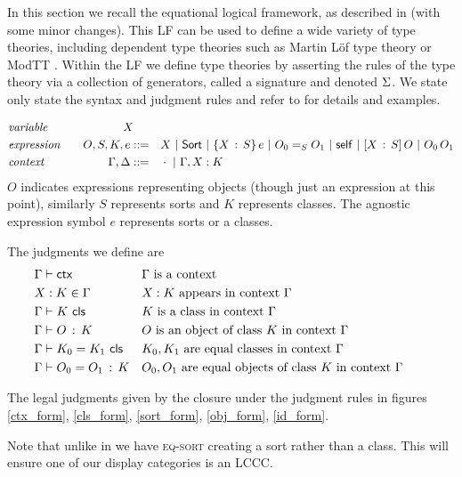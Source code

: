 In this section we recall the equational logical framework,
as described in \cite{harper2021equational} (with some minor changes).
This LF can be used to define a wide variety of type theories,
including dependent type theories such as Martin L{\"o}f type theory or
\textsf{ModTT} \cite{Sterling_2021}.
Within the LF we define type theories by asserting the rules of the type theory
via a collection of generators, called a signature and denoted $\Sigma$.
We state only state the syntax and judgment rules
and refer to \cite{harper2021equational} for details and examples.

\begin{align*}
  &\textit{variable} \quad & X {\color{white} ::=} \quad & \\
  &\textit{expression} \quad & O, S, K, e ::= \quad & X \BNFSep \SortCS \BNFSep \PiCS{X}{S}{e}
                                     \BNFSep \EqCS{S}{O_{0}}{O_{1}} \BNFSep \SelfCS \BNFSep \LamCS{X}{S}{O} \BNFSep \ApCS{O_{0}}{O_{1}} \\
  &\textit{context} \quad & \Ga, \De ::= \quad & \cdot \BNFSep \CtxExt{\Ga}{X}{K}
\end{align*}
$O$ indicates expressions representing objects
(though just an expression at this point),
similarly $S$ represents sorts and $K$ represents classes.
The agnostic expression symbol $e$ represents sorts or a classes.

The judgments we define are
\begin{align*}
  &\Gamma \vdash \mathsf{ctx} && \Gamma \text{ is a context }  \\
  &X:K \in \Gamma && X:K \text{ appears in context } \Gamma \\
  &\Gamma \vdash K \,\, \mathsf{cls} && K \text{ is a class in context } \Gamma \\
  &\Gamma \vdash O \, : \, K && O \text{ is an object of class } K
    \text{ in context } \Gamma && \\
  &\Gamma \vdash K_{0} = K_{1} \,\, \mathsf{cls} && K_{0}, K_{1}
    \text{ are equal classes in context } \Gamma \\
  &\Gamma \vdash O_{0} = O_{1} \, : \, K && O_{0},O_{1}
    \text{ are equal objects of class } K
    \text{ in context } \Gamma
\end{align*}

The legal judgments given by the closure under the judgment rules
in figures \ref{ctx_form}, \ref{cls_form}, \ref{sort_form}, \ref{obj_form},
\ref{id_form}.

Note that unlike in \cite{harper2021equational} we have \textsc{eq-sort}
creating a sort rather than a class.
This will ensure one of our display categories is an LCCC.

